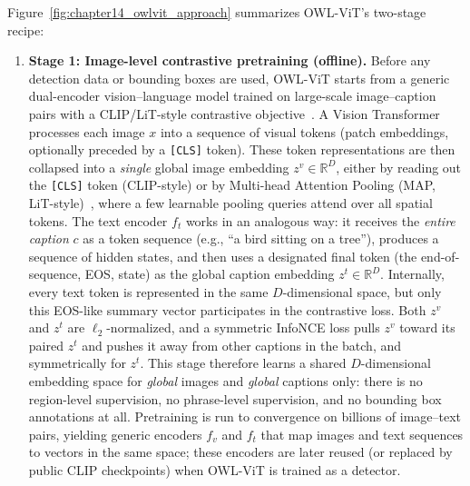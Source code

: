 \begin{enrichment}
\begin{enrichment}[Method][subsection]
		Figure~\ref{fig:chapter14_owlvit_approach} summarizes OWL-ViT’s two-stage recipe:
		\begin{enumerate}
			\item \textbf{Stage 1: Image-level contrastive pretraining (offline).}
			Before any detection data or bounding boxes are used, OWL-ViT starts from a generic dual-encoder vision--language model trained on large-scale image--caption pairs with a CLIP/LiT-style contrastive objective~\cite{radford2021_clip,zhai2022_lit,minderer2022_owlvit}.
			A Vision Transformer~\cite{vit2020_transformers} processes each image $x$ into a sequence of visual tokens (patch embeddings, optionally preceded by a \texttt{[CLS]} token).
			These token representations are then collapsed into a \emph{single} global image embedding $z^v \in \mathbb{R}^D$, either by reading out the \texttt{[CLS]} token (CLIP-style) or by Multi-head Attention Pooling (MAP, LiT-style)~\cite{zhai2022_lit}, where a few learnable pooling queries attend over all spatial tokens.
			The text encoder $f_t$ works in an analogous way: it receives the \emph{entire caption} $c$ as a token sequence (e.g., ``a bird sitting on a tree''), produces a sequence of hidden states, and then uses a designated final token (the end-of-sequence, EOS, state) as the global caption embedding $z^t \in \mathbb{R}^D$.
			Internally, every text token is represented in the same $D$-dimensional space, but only this EOS-like summary vector participates in the contrastive loss.
			Both $z^v$ and $z^t$ are $\ell_2$-normalized, and a symmetric InfoNCE loss pulls $z^v$ toward its paired $z^t$ and pushes it away from other captions in the batch, and symmetrically for $z^t$.
			This stage therefore learns a shared $D$-dimensional embedding space for \emph{global} images and \emph{global} captions only: there is no region-level supervision, no phrase-level supervision, and no bounding box annotations at all.
			Pretraining is run to convergence on billions of image--text pairs, yielding generic encoders $f_v$ and $f_t$ that map images and text sequences to vectors in the same space; these encoders are later reused (or replaced by public CLIP checkpoints) when OWL-ViT is trained as a detector.
			

\end{enumerate}
\end{enrichment}
\end{enrichment}
